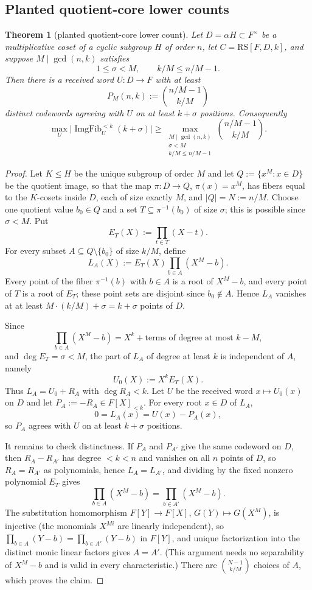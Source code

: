 \documentclass[11pt]{article}
\newtheorem{theorem}{Theorem}[section]
\theoremstyle{definition}
\theoremstyle{remark}
\newcommand{\RS}{\mathrm{RS}}
\providecommand{\ImgFib}{\operatorname{ImgFib}}
\begin{document}
\subsection{Planted quotient-core lower counts}

\begin{theorem}[planted quotient-core lower count]\label{thm:capf-planted}
Let $D=\alpha H\subset F^\times$ be a multiplicative coset of a cyclic subgroup $H$ of order $n$, let $C=\RS[F,D,k]$, and suppose $M\mid\gcd(n,k)$ satisfies
\[
        1\le \sigma<M,
        \qquad
        k/M\le n/M-1.
\]
Then there is a received word $U:D\to F$ with at least
\[
        P_M(n,k):=\binom{n/M-1}{k/M}
\]
distinct codewords agreeing with $U$ on at least $k+\sigma$ positions.  Consequently
\[
\max_U \bigl|\ImgFib_U^{<k}(k+\sigma)\bigr|
\ge
\max_{\substack{M\mid\gcd(n,k)\\ \sigma<M\\ k/M\le n/M-1}}
\binom{n/M-1}{k/M}.
\]
\end{theorem}

\begin{proof}
Let $K\le H$ be the unique subgroup of order $M$ and let $Q:=\{x^M:x\in D\}$ be the quotient image, so that the map $\pi:D\to Q$, $\pi(x)=x^M$, has fibers equal to the $K$-cosets inside $D$, each of size exactly $M$, and $|Q|=N:=n/M$.  Choose one quotient value $b_0\in Q$ and a set $T\subseteq\pi^{-1}(b_0)$ of size $\sigma$; this is possible since $\sigma<M$.  Put
\[
        E_T(X):=\prod_{t\in T}(X-t).
\]
For every subset $A\subseteq Q\setminus\{b_0\}$ of size $k/M$, define
\[
        L_A(X):=E_T(X)\prod_{b\in A}(X^M-b).
\]
Every point of the fiber $\pi^{-1}(b)$ with $b\in A$ is a root of $X^M-b$, and every point of $T$ is a root of $E_T$; these point sets are disjoint since $b_0\notin A$.  Hence $L_A$ vanishes at at least $M\cdot(k/M)+\sigma=k+\sigma$ points of $D$.

Since
\[
        \prod_{b\in A}(X^M-b)=X^k+\text{terms of degree at most }k-M,
\]
and $\deg E_T=\sigma<M$, the part of $L_A$ of degree at least $k$ is independent of $A$, namely
\[
        U_0(X):=X^kE_T(X).
\]
Thus $L_A=U_0+R_A$ with $\deg R_A<k$.  Let $U$ be the received word $x\mapsto U_0(x)$ on $D$ and let $P_A:=-R_A\in F[X]_{<k}$.  For every root $x\in D$ of $L_A$,
\[
        0=L_A(x)=U(x)-P_A(x),
\]
so $P_A$ agrees with $U$ on at least $k+\sigma$ positions.

It remains to check distinctness.  If $P_A$ and $P_{A'}$ give the same codeword on $D$, then $R_A-R_{A'}$ has degree $<k<n$ and vanishes on all $n$ points of $D$, so $R_A=R_{A'}$ as polynomials, hence $L_A=L_{A'}$, and dividing by the fixed nonzero polynomial $E_T$ gives
\[
        \prod_{b\in A}(X^M-b)=\prod_{b\in A'}(X^M-b).
\]
The substitution homomorphism $F[Y]\to F[X]$, $G(Y)\mapsto G(X^M)$, is injective \textup{(the monomials $X^{Mi}$ are linearly independent)}, so $\prod_{b\in A}(Y-b)=\prod_{b\in A'}(Y-b)$ in $F[Y]$, and unique factorization into the distinct monic linear factors gives $A=A'$.  \textup{(This argument needs no separability of $X^M-b$ and is valid in every characteristic.)}  There are $\binom{N-1}{k/M}$ choices of $A$, which proves the claim.
\end{proof}
\end{document}
